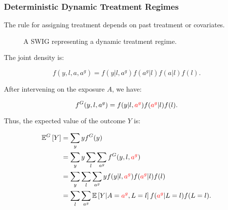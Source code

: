 \documentclass[12pt,twoside]{article}
\begin{document}
\subsubsection{Deterministic Dynamic Treatment Regimes}
The rule for assigning treatment depends on past treatment or covariates.

\begin{figure}[ht]
\centering
{}
\caption{A SWIG representing a dynamic treatment regime.}
\label{fig:swig_det_dyn_inv}
\end{figure}

The joint density is:

\begin{equation}
    f(y,l,a,a^g) = f(y|l,a^g) f(a^g|l) f(a|l) f(l).
\end{equation}

After intervening on the exposure $A$, we have:

\begin{equation}
    f^G(y,l,a^g) = f(y|l,\textcolor{red}{a^g}) f(\textcolor{red}{a^g}|l) f(l).
\end{equation}

Thus, the expected value of the outcome $Y$ is:

\begin{align}
    \mathbb{E}^G \left[ Y \right] &= \sum_y y f^G(y) \\
    &= \sum_y y \sum_l \sum_{a^g} f^G(y,l,\textcolor{red}{a^g}) \\
    &= \sum_y \sum_l \sum_{a^g} y f(y|l,\textcolor{red}{a^g}) f(\textcolor{red}{a^g}|l) f(l) \\
    &= \sum_l \sum_{a^g} \mathbb{E} \left[ Y|A=\textcolor{red}{a^g},L=l\right] f(\textcolor{red}{a^g}|L=l) f(L=l).
\end{align}
\end{document}
